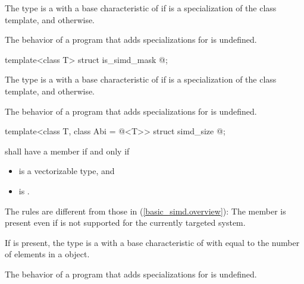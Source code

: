 \begin{itemdescr}
\pnum
The type  is a  with a base characteristic of  if  is a specialization of the  class template, and  otherwise.

\pnum
The behavior of a program that adds specializations for  is undefined.
\end{itemdescr}

\begin{itemdecl}
template<class T> struct is_simd_mask { @\seebelow@ };
\end{itemdecl}

\begin{itemdescr}
\pnum
The type  is a  with a base characteristic of  if  is a specialization of the  class template, and  otherwise.

\pnum
The behavior of a program that adds specializations for  is undefined.
\end{itemdescr}

\begin{itemdecl}
template<class T, class Abi = @\nativeabi@<T>> struct simd_size { @\seebelow@ };
\end{itemdecl}

\begin{itemdescr}
\pnum
{} shall have a member  if and only if
\begin{itemize}
  \item {} is a vectorizable type, and
  \item {} is .
\end{itemize}
\begin{note}
  The rules are different from those in (\ref{basic_simd.overview}):
  The member  is present even if  is not supported for the currently targeted system.
\end{note}

\pnum
If  is present, the type  is a  with a base characteristic of  with  equal to the number of elements in a  object.

\pnum
The behavior of a program that adds specializations for  is undefined.
\end{itemdescr}

